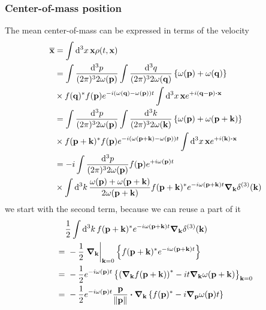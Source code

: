 \subsubsection{Center-of-mass position}

The mean center-of-mass can be expressed in terms of the velocity
\begin{equation}
	\begin{split}
		\overline{\vb{x}}
		&=
		\int\dd[3]{x}\vb{x}\rho(t,\vb{x})
		\\
		&=
		\int\frac{\dd[3]{p}}{(2\pi)^32\omega(\vb{p})}
		\int\frac{\dd[3]{q}}{(2\pi)^32\omega(\vb{q})}
		\left\{
			\omega(\vb{p})
			+
			\omega(\vb{q})
		\right\}
		\\
		&\times
		f(\vb{q})^*
		f(\vb{p})
		e^{-i\left(\omega(\vb{q})-\omega(\vb{p})\right)t}
		\int\dd[3]{x}
		\vb{x}
		e^{+i(\vb{q}-\vb{p})\vdot\vb{x}}
		\\
		&=
		\int\frac{\dd[3]{p}}{(2\pi)^32\omega(\vb{p})}
		\int\frac{\dd[3]{k}}{(2\pi)^32\omega(\vb{k})}
		\left\{
			\omega(\vb{p})
			+
			\omega(\vb{p}+\vb{k})
		\right\}
		\\
		&\times
		f(\vb{p}+\vb{k})^*
		f(\vb{p})
		e^{-i\left(\omega(\vb{p}+\vb{k})-\omega(\vb{p})\right)t}
		\int\dd[3]{x}
		\vb{x}
		e^{+i(\vb{k})\vdot\vb{x}}
		\\
		&=
		-i
		\int\frac{\dd[3]{p}}{(2\pi)^32\omega(\vb{p})}
		f(\vb{p})
		e^{+i\omega(\vb{p})t}
		\\
		&\times
		\int\dd[3]{k}
		\frac{\omega(\vb{p})+\omega(\vb{p}+\vb{k})}{2\omega(\vb{p}+\vb{k})}
		f(\vb{p}+\vb{k})^*
		e^{-i\omega(\vb{p}+\vb{k})t}
		\grad_{\vb{k}}
		\delta^{(3)}(\vb{k})
	\end{split}
	\label{qkg:mean_position}
\end{equation}
we start with the second term, because we can reuse a part of it
\begin{equation}
	\begin{split}
		&
		\frac{1}{2}
		\int\dd[3]{k}
		f(\vb{p}+\vb{k})^*
		e^{-i\omega(\vb{p}+\vb{k})t}
		\grad_{\vb{k}}
		\delta^{(3)}(\vb{k})
		\\
		=&\
		-
		\frac{1}{2}
		\eval{\grad_{\vb{k}}}_{\vb{k}=0}
		\left\{
			f(\vb{p}+\vb{k})^*
			e^{-i\omega(\vb{p}+\vb{k})t}
		\right\}
		\\
		=&\
		-
		\frac{1}{2}
		e^{-i\omega(\vb{p})t}
		\left\{
			\left(\grad_{\vb{k}}f(\vb{p}+\vb{k})\right)^*
			-
			it\grad_{\vb{k}}\omega(\vb{p}+\vb{k})
		\right\}_{\vb{k}=0}
		\\
		=&\
		-
		\frac{1}{2}
		e^{-i\omega(\vb{p})t}
		\frac{\vb{p}}{\norm{\vb{p}}}
		\vdot\grad_{\vb{k}}
		\left\{
			f(\vb{p})^*
			-
			i\grad_{\vb{p}}\omega(\vb{p})t
		\right\}
	\end{split}
\end{equation}
